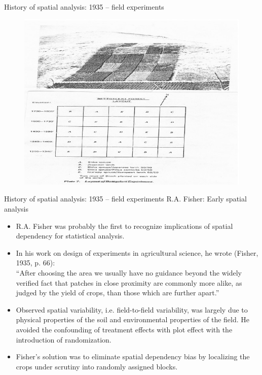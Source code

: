 \documentclass{beamer}
\begin{document}
\begin{frame}{History of spatial analysis: 1935 -- field experiments}
\vspace{-0.5cm}
\begin{figure}
	\includegraphics[width=.8\textwidth]{IMG/sp_Fisher.jpg}
\end{figure}
\end{frame}
\begin{frame}{History of spatial analysis: 1935 -- field experiments}
 R.A. Fisher: Early spatial analysis\\
\medskip
\begin{itemize}
    \item R.A. Fisher was probably the first to recognize implications of spatial dependency for statistical analysis.
    \smallskip
    \item In his work on design of experiments in agricultural science, he wrote (Fisher, 1935, p. 66):\\
    ``After choosing the area we usually have no guidance beyond the widely verified fact that patches in close proximity are commonly more alike, as judged by the yield of crops, than those which are further apart.''
    \smallskip
    \item Observed spatial variability, i.e. field-to-field variability, was largely due to physical properties of the soil and environmental properties of the field. He avoided the confounding of treatment effects with plot effect with the introduction of randomization.
    \smallskip
    \item Fisher's solution was to eliminate spatial dependency bias by localizing the crops under scrutiny into randomly assigned blocks.
\end{itemize}
\end{frame}
\end{document}
